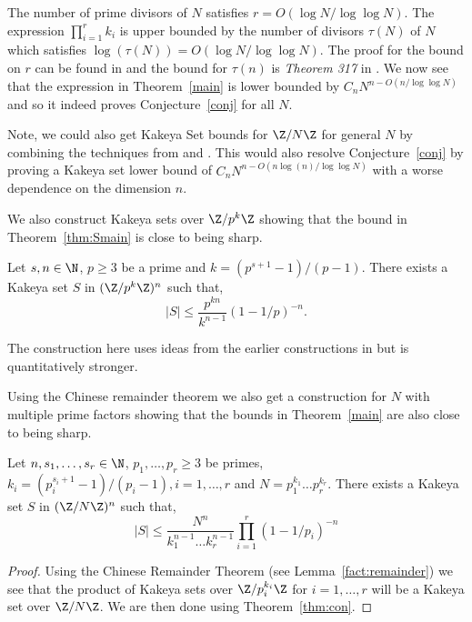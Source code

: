 \begin{obs}\label{obs:no}
The number of prime divisors of $N$ satisfies $r = O( \log N / \log \log N)$. The expression $\prod_{i=1}^{r} k_i$ is upper bounded by the number of divisors $\tau(N)$ of $N$ which satisfies $\log(\tau(N))=O( \log N / \log \log N)$. The proof for the bound on $r$ can be found in \cite{zbMATH02610444} and the bound for $\tau(n)$ is {\em Theorem 317} in \cite{Hardy2008AnIT}. We now see that the expression in Theorem~\ref{main} is lower bounded by $C_n N^{n - O(n/\log \log N)}$ and so it indeed proves Conjecture~\ref{conj} for all $N$. \end{obs}

Note, we could also get Kakeya Set bounds for $\Z/N\Z$ for general $N$ by combining the techniques from \cite{arsovski2021padic} and \cite{dhar2021proof}. This would also resolve Conjecture~\ref{conj} by proving a Kakeya set lower bound of $C_n N^{n - O(n\log(n)/\log \log N)}$ with a worse dependence on the dimension $n$.

We also construct Kakeya sets over $\Z/p^k\Z$ showing that the bound in Theorem~\ref{thm:Smain} is close to being sharp. 

\begin{thm}\label{thm:con}
Let $s,n\in \N$, $p\ge 3$ be a prime and $k=(p^{s+1}-1)/(p-1)$. There exists a Kakeya set $S$ in $(\Z/p^k\Z)^n$ such that,
$$|S|\le \frac{p^{kn}}{k^{n-1}}(1-1/p)^{-n}.$$
\end{thm}

The construction here uses ideas from the earlier constructions in \cite{hickman2018fourier,Fraser_2016,CML_2018__10_1_3_0} but is quantitatively stronger.

Using the Chinese remainder theorem we also get a construction for $N$ with multiple prime factors showing that the bounds in Theorem~\ref{main} are also close to being sharp.

\begin{cor}\label{cor:con}
Let $n,s_1,\hdots,s_r\in \N$, $p_1,\hdots,p_r\ge 3$ be primes, $k_i=(p_i^{s_i+1}-1)/(p_i-1),i=1,\hdots,r$ and $N=p_1^{k_1}\hdots p_r^{k_r}$. There exists a Kakeya set $S$ in $(\Z/N\Z)^n$ such that,
$$|S|\le \frac{N^n}{k_1^{n-1}\hdots k_r^{n-1}} \prod\limits_{i=1}^r (1-1/p_i)^{-n} $$
\end{cor}
\begin{proof}
Using the Chinese Remainder Theorem (see Lemma~\ref{fact:remainder}) we see that the product of Kakeya sets over $\Z/p_i^{k_i}\Z$ for $i=1,\hdots,r$ will be a Kakeya set over $\Z/N\Z$. We are then done using Theorem~\ref{thm:con}.
\end{proof}

